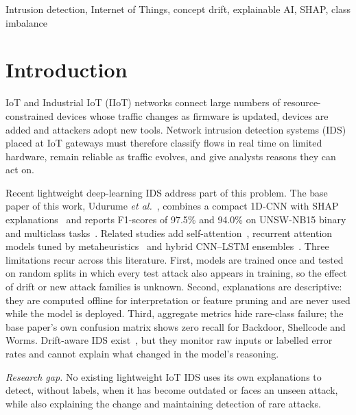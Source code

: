 \documentclass[conference]{IEEEtran}
\begin{document}
\begin{IEEEkeywords}
Intrusion detection, Internet of Things, concept drift, explainable AI, SHAP, class imbalance
\end{IEEEkeywords}

\section{Introduction}
IoT and Industrial IoT (IIoT) networks connect large numbers of resource-constrained devices whose traffic changes as firmware is updated, devices are added and attackers adopt new tools. Network intrusion detection systems (IDS) placed at IoT gateways must therefore classify flows in real time on limited hardware, remain reliable as traffic evolves, and give analysts reasons they can act on.

Recent lightweight deep-learning IDS address part of this problem. The base paper of this work, Udurume \textit{et al.}~\cite{udurume2026}, combines a compact 1D-CNN with SHAP explanations~\cite{lundberg2017} and reports F1-scores of 97.5\% and 94.0\% on UNSW-NB15 binary and multiclass tasks~\cite{moustafa2015}. Related studies add self-attention~\cite{sharma2025}, recurrent attention models tuned by metaheuristics~\cite{nasir2026,guo2026} and hybrid CNN--LSTM ensembles~\cite{chen2026}. Three limitations recur across this literature. First, models are trained once and tested on random splits in which every test attack also appears in training, so the effect of drift or new attack families is unknown. Second, explanations are descriptive: they are computed offline for interpretation or feature pruning and are never used while the model is deployed. Third, aggregate metrics hide rare-class failure; the base paper's own confusion matrix shows zero recall for Backdoor, Shellcode and Worms. Drift-aware IDS exist~\cite{obaidat2026,aly2025,agbedanu2025}, but they monitor raw inputs or labelled error rates and cannot explain what changed in the model's reasoning.

\textit{Research gap.} No existing lightweight IoT IDS uses its own explanations to detect, without labels, when it has become outdated or faces an unseen attack, while also explaining the change and maintaining detection of rare attacks.
\end{document}
